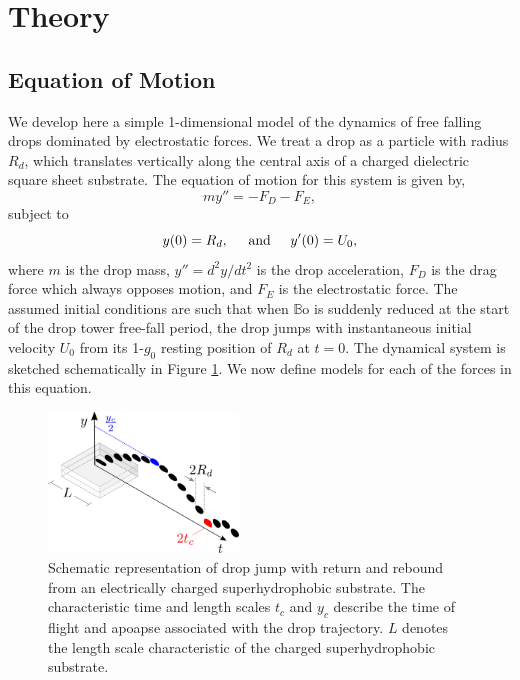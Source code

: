 \documentclass[aip,reprint, floatfix]{revtex4-1}
\begin{document}
\section{Theory}
\subsection{Equation of Motion}
We develop here a simple 1-dimensional model of the dynamics of free falling drops dominated by electrostatic forces. We treat a drop as a particle with radius $R_d$, which translates vertically along the central axis of a charged dielectric square sheet substrate. The equation of motion for this system is given by,
\begin{equation}
m y'' = - F_D - F_E,
\label{gov_eqn}
\end{equation}
subject to
\begin{equation}
y(0) = R_d, \hspace{5 mm} \mbox{and} \hspace{5 mm} y'(0) = U_0,
\end{equation}
where $m$ is the drop mass, $y'' = d^2 y/d t^2$ is the drop acceleration, $F_D$ is the drag force which always opposes motion, and $F_E$ is the electrostatic force. The assumed initial conditions are such that when $\mathbb{B}\mbox{o}$ is suddenly reduced at the start of the drop tower free-fall period, the drop jumps with instantaneous initial velocity $U_0$ from its 1-$g_0$ resting position of $R_d$ at $t=0$. The dynamical system is sketched schematically in Figure \ref{fig:apparatus}. We now define models for each of the forces in this equation.

\begin{figure}[ht]
\centering
\includegraphics[width=0.45\textwidth]{../figures/apparatus3.pdf}
\caption{Schematic representation of drop jump with return and rebound from an electrically charged superhydrophobic substrate. The characteristic time and length scales $t_c$ and $y_c$ describe the time of flight and apoapse associated with the drop trajectory. $L$ denotes the length scale characteristic of the charged superhydrophobic substrate.}
\label{fig:apparatus}
\end{figure}
\end{document}
